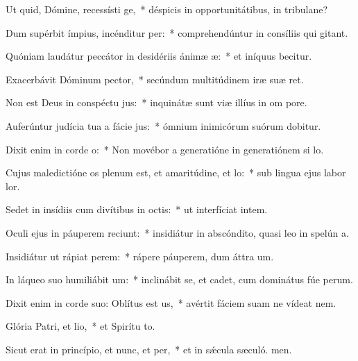 \item Ut quid, Dómine, recessísti ge,~* déspicis in opportunitátibus, in tribulane?
\item Dum supérbit ímpius, incénditur per:~* comprehendúntur in consíliis qui gitant.
\item Quóniam laudátur peccátor in desidériis ánimæ æ:~* et iníquus becitur.
\item Exacerbávit Dóminum pector,~* secúndum multitúdinem iræ suæ  ret.
\item Non est Deus in conspéctu jus:~* inquinátæ sunt viæ illíus in om pore.
\item Auferúntur judícia tua a fácie jus:~* ómnium inimicórum suórum dobitur.
\item Dixit enim in corde o:~* Non movébor a generatióne in generatiónem si lo.
\item Cujus maledictióne os plenum est, et amaritúdine, et lo:~* sub lingua ejus labor  lor.
\item Sedet in insídiis cum divítibus in octis:~* ut interfíciat intem.
\item Oculi ejus in páuperem reciunt:~* insidiátur in abscóndito, quasi leo in spelún a.
\item Insidiátur ut rápiat perem:~* rápere páuperem, dum áttra um.
\item In láqueo suo humiliábit um:~* inclinábit se, et cadet, cum dominátus fúe perum.
\item Dixit enim in corde suo: Oblítus est us,~* avértit fáciem suam ne vídeat  nem.
\item Glória Patri, et lio,~* et Spirítu to.
\item Sicut erat in princípio, et nunc, et per,~* et in sǽcula sæculó. men.
